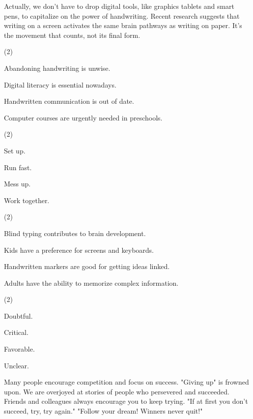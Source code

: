 \documentclass{英语试卷}
\begin{document}
\par Actually, we don't have to drop digital tools, like graphics tablets and smart pens, to capitalize on the power of handwriting. Recent research suggests that writing on a screen activates the same brain pathways as writing on paper. It's the movement that counts, not its final form.\par
{}
\begin{choices}(2)
  \item Abandoning handwriting is unwise.
  \item Digital literacy is essential nowadays.
  \item Handwritten communication is out of date.
  \item Computer courses are urgently needed in preschools.
\end{choices}
\begin{choices}(2)
  \item Set up.
  \item Run fast.
  \item Mess up.
  \item Work together.
\end{choices}
\begin{choices}(2)
  \item Blind typing contributes to brain development.
  \item Kids have a preference for screens and keyboards.
  \item Handwritten markers are good for getting ideas linked.
  \item Adults have the ability to memorize complex information.
\end{choices}
\begin{choices}(2)
  \item Doubtful.
  \item Critical.
  \item Favorable.
  \item Unclear.
\end{choices}
\par Many people encourage competition and focus on success. "Giving up" is frowned upon. We are overjoyed at stories of people who persevered and succeeded. Friends and colleagues always encourage you to keep trying. "If at first you don't succeed, try, try again." "Follow your dream! Winners never quit!"\par
\end{document}
